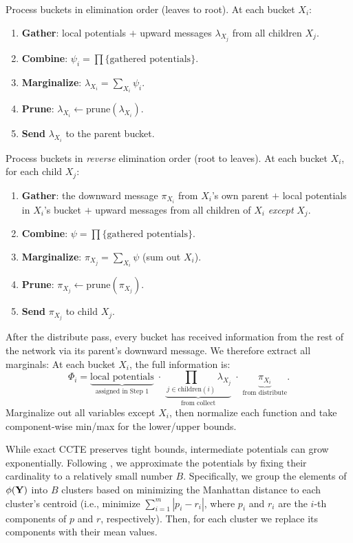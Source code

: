 \documentclass{article}
\begin{document}
Process buckets in elimination order (leaves to root). At each bucket $X_i$:
\begin{enumerate}
  \item \textbf{Gather}: local potentials $+$ upward messages $\lambda_{X_j}$ from
        all children $X_j$.
  \item \textbf{Combine}: $\psi_i = \prod \{\text{gathered potentials}\}$.
  \item \textbf{Marginalize}: $\lambda_{X_i} = \sum_{X_i} \psi_i$.
  \item \textbf{Prune}: $\lambda_{X_i} \gets \mathrm{prune}(\lambda_{X_i})$.
  \item \textbf{Send} $\lambda_{X_i}$ to the parent bucket.
\end{enumerate}

Process buckets in \emph{reverse} elimination order (root to leaves). At each
bucket $X_i$, for each child $X_j$:
\begin{enumerate}
  \item \textbf{Gather}: the downward message $\pi_{X_i}$ from $X_i$'s own parent
        $+$ local potentials in $X_i$'s bucket $+$ upward messages from all children
        of $X_i$ \emph{except} $X_j$.
  \item \textbf{Combine}: $\psi = \prod \{\text{gathered potentials}\}$.
  \item \textbf{Marginalize}: $\pi_{X_j} = \sum_{X_i} \psi$ (sum out $X_i$).
  \item \textbf{Prune}: $\pi_{X_j} \gets \mathrm{prune}(\pi_{X_j})$.
  \item \textbf{Send} $\pi_{X_j}$ to child $X_j$.
\end{enumerate}

After the distribute pass, every bucket has received information from the rest of the network via its parent's downward message. We therefore extract all marginals: At each bucket $X_i$, the full information is:
\[
  \Phi_i = \underbrace{\text{local potentials}}_{\text{assigned in Step~1}}
  \;\cdot\; \underbrace{\prod_{j \in \mathrm{children}(i)} \lambda_{X_j}}_{\text{from collect}}
  \;\cdot\; \underbrace{\pi_{X_i}}_{\text{from distribute}}.
\]
Marginalize out all variables except $X_i$, then normalize each function and take component-wise min/max for the lower/upper bounds.

While exact CCTE preserves tight bounds, intermediate potentials can grow exponentially. Following \cite{maua2020ijar,marinescu2026iclr}, we approximate the potentials by fixing their cardinality to a relatively small number $B$. Specifically, we group the elements of $\phi(\mathbf{Y})$ into $B$ clusters based on minimizing the Manhattan distance to each cluster's centroid (i.e., minimize $\sum_{i=1}^{m} |p_i - r_i|$, where $p_i$ and $r_i$ are the $i$-th components of $p$ and $r$, respectively). Then, for each cluster we replace its components with their mean values.
\end{document}
